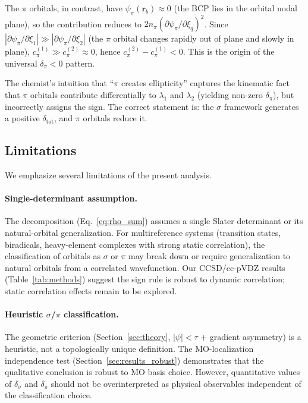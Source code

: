 \documentclass[11pt,a4paper]{article}
\newcommand{\delsg}{\delta_{\sigma}}
\newcommand{\delpi}{\delta_{\pi}}
\begin{document}
The $\pi$ orbitals, in contrast, have $\psi_\pi(\mathbf{r}_b) \approx 0$
(the BCP lies in the orbital nodal plane), so the contribution
reduces to $2 n_\pi (\partial \psi_\pi / \partial \xi_q)^2$. Since
$|\partial \psi_\pi / \partial \xi_1| \gg |\partial \psi_\pi / \partial \xi_2|$
(the $\pi$ orbital changes rapidly out of plane and slowly in
plane), $c_\pi^{(1)} \gg c_\pi^{(2)} \approx 0$, hence
$c_\pi^{(2)} - c_\pi^{(1)} < 0$. This is the origin of the universal
$\delpi < 0$ pattern.

The chemist's intuition that ``$\pi$ creates ellipticity'' captures
the kinematic fact that $\pi$ orbitals contribute differentially to
$\lambda_1$ and $\lambda_2$ (yielding non-zero $\delpi$), but
incorrectly assigns the sign. The correct statement is: the
$\sigma$ framework generates a positive $\delta_{\text{tot}}$,
and $\pi$ orbitals reduce it.

\subsection{Limitations}

We emphasize several limitations of the present analysis.

\paragraph{Single-determinant assumption.}
The decomposition (Eq.~\ref{eq:rho_sum}) assumes a single Slater
determinant or its natural-orbital generalization. For
multireference systems (transition states, biradicals,
heavy-element complexes with strong static correlation), the
classification of orbitals as $\sigma$ or $\pi$ may break down
or require generalization to natural orbitals from a
correlated wavefunction. Our CCSD/cc-pVDZ results
(Table~\ref{tab:methods}) suggest the sign rule is robust to
dynamic correlation; static correlation effects remain to be
explored.

\paragraph{Heuristic $\sigma$/$\pi$ classification.}
The geometric criterion (Section~\ref{sec:theory}, $|\psi| < \tau$
+ gradient asymmetry) is a heuristic, not a topologically
unique definition. The MO-localization independence test
(Section~\ref{sec:results_robust}) demonstrates that the
qualitative conclusion is robust to MO basis choice. However,
quantitative values of $\delsg$ and $\delpi$ should not be
overinterpreted as physical observables independent of the
classification choice.
\end{document}
